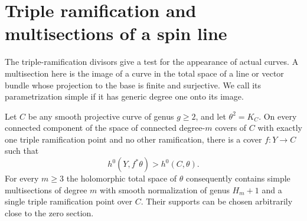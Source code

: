 \section{Triple ramification and multisections of a spin line}\label{p8-sec:graphs}

The triple-ramification divisors give a test for the appearance of
actual curves. A multisection here is the image of a curve in the
total space of a line or vector bundle whose projection to the base
is finite and surjective. We call its parametrization simple if it
has generic degree one onto its image.

\begin{theorem}\label{p8-thm:algebraic-graphs}
Let $C$ be any smooth projective curve of genus $g\ge2$, and let
$\theta^2=K_C$. On every connected component of the space of connected
degree-$m$ covers of $C$ with exactly one triple ramification point
and no other ramification, there is a cover $f:Y\to C$ such that
\[
                       h^0(Y,f^*\theta)>h^0(C,\theta).
\]
For every $m\ge3$ the holomorphic total space of $\theta$ consequently
contains simple multisections of degree $m$ with smooth normalization
of genus $H_m+1$ and a single triple ramification point over $C$.
Their supports can be chosen arbitrarily close to the zero section.
\end{theorem}
